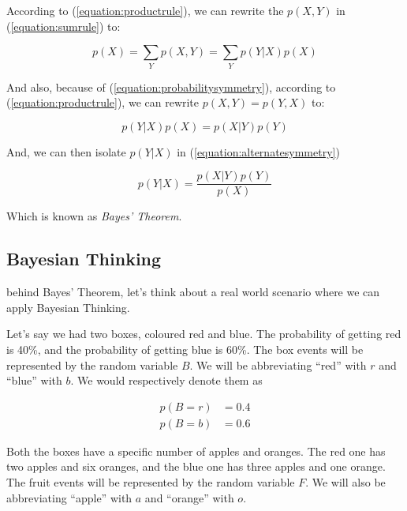 \documentclass{tufte-handout}
\begin{document}
According to (\ref{equation:productrule}), we can rewrite the $p(X, Y)$ in
(\ref{equation:sumrule}) to:

\begin{equation}
  p(X) = \sum\limits_{Y}p(X, Y) = \sum\limits_{Y}p(Y|X)p(X)
\end{equation}

And also, because of (\ref{equation:probabilitysymmetry}), according to
(\ref{equation:productrule}), we can rewrite $p(X, Y) = p(Y, X)$ to:

\begin{equation}\label{equation:alternatesymmetry}
  p(Y|X)p(X) = p(X|Y)p(Y)
\end{equation}

And, we can then isolate $p(Y|X)$ in (\ref{equation:alternatesymmetry})

\begin{equation}
  p(Y|X) = \frac{p(X|Y)p(Y)}{p(X)}
\end{equation}

Which is known as \emph{Bayes' Theorem}.

\subsection{Bayesian Thinking}

 behind Bayes' Theorem, let's think about a
real world scenario where we can apply Bayesian Thinking.

Let's say we had two boxes, coloured red and blue. The probability of getting
red is 40\%, and the probability of getting blue is 60\%. The box events will
be represented by the random variable $B$. We will be abbreviating ``red'' with
$r$ and ``blue'' with $b$. We would respectively denote them as

\begin{align}
  p(B = r) &= 0.4 \\
  p(B = b) &= 0.6
\end{align}

Both the boxes have a specific number of apples and oranges. The red one has
two apples and six oranges, and the blue one has three apples and one orange.
The fruit events will be represented by the random variable $F$. We will also
be abbreviating ``apple'' with $a$ and ``orange'' with $o$.
\end{document}
